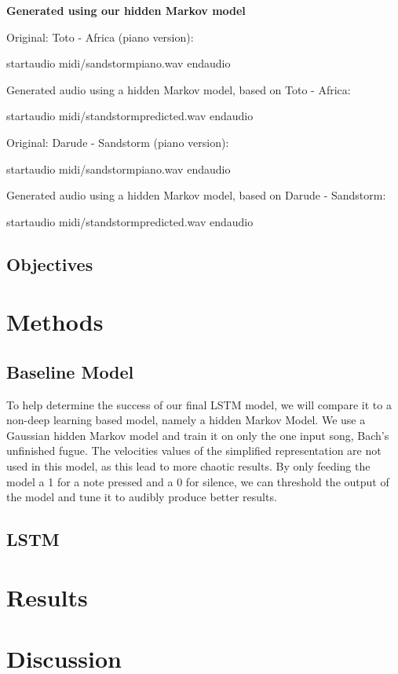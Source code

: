 \documentclass[11pt, twocolumn]{article}
\begin{document}
\ifpdf
\else
\textbf{Generated using our hidden Markov model}

Original: Toto - Africa (piano version):

startaudio midi/sandstormpiano.wav endaudio

Generated audio using a hidden Markov model, based on Toto - Africa:

startaudio midi/standstormpredicted.wav endaudio

Original: Darude - Sandstorm (piano version):

startaudio midi/sandstormpiano.wav endaudio

Generated audio using a hidden Markov model, based on Darude - Sandstorm:

startaudio midi/standstormpredicted.wav endaudio
\fi
    
\subsection{Objectives}


\section{Methods}

\subsection{Baseline Model}
To help determine the success of our final LSTM model, we will compare it to a non-deep learning based model, namely a hidden Markov Model. We use a Gaussian hidden Markov model and train it on only the one input song, Bach's unfinished fugue. The velocities values of the simplified representation are not used in this model, as this lead to more chaotic results. By only feeding the model a 1 for a note pressed and a 0 for silence, we can threshold the output of the model and tune it to audibly produce better results.
\subsection{LSTM}

\lipsum[1-5]


\section{Results}
\section{Discussion}
 



\end{document}
